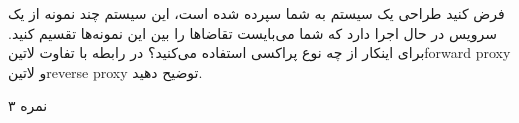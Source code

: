 
فرض کنید طراحی یک سیستم به شما سپرده شده است، این سیستم چند نمونه از یک سرویس در حال اجرا دارد که شما می‌بایست تقاضاها را بین این نمونه‌ها تقسیم کنید. برای اینکار از چه نوع پراکسی استفاده می‌کنید؟
در رابطه با تفاوت ‌لاتین{forward proxy} و ‌لاتین{reverse proxy} توضیح دهید.

۳ نمره
